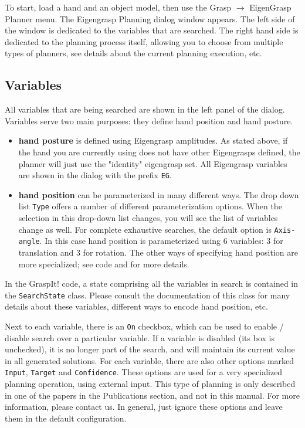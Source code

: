 To start, load a hand and an object model, then use the Grasp $\rightarrow$
EigenGrasp Planner menu. The Eigengrasp Planning dialog window
appears. The left side of the window is dedicated to the variables
that are searched. The right hand side is dedicated to the planning
process itself, allowing you to choose from multiple types of
planners, see details about the current planning execution, etc.

\subsection{Variables}

All variables that are being searched are shown in the left panel of
the dialog. Variables serve two main purposes: they define hand
position and hand posture.
\begin{itemize}
\item \textbf{hand posture} is defined using Eigengrasp amplitudes. As
  stated above, if the hand you are currently using does not have
  other Eigengrasps defined, the planner will just use the "identity"
  eigengrasp set. All Eigengrasp variables are shown in the dialog
  with the prefix \texttt{EG}.
\item \textbf{hand position} can be parameterized in many different
  ways. The drop down list \texttt{Type} offers a number of different
  parameterization options. When the selection in this drop-down list
  changes, you will see the list of variables change as well. For
  complete exhaustive searches, the default option is
  \texttt{Axis-angle}. In this case hand position is parameterized
  using 6 variables: 3 for translation and 3 for rotation. The other
  ways of specifying hand position are more specialized; see code and
   for more details.
\end{itemize}

In the GraspIt! code, a state comprising all the variables in search
is contained in the \texttt{SearchState} class. Please consult the
documentation of this class for many details about these variables,
different ways to encode hand position, etc.

Next to each variable, there is an \texttt{On} checkbox, which can be
used to enable / disable search over a particular variable. If a
variable is disabled (its box is unchecked), it is no longer part of
the search, and will maintain its current value in all generated
solutions. For each variable, there are also other options marked
\texttt{Input}, \texttt{Target} and \texttt{Confidence}. These options
are used for a very specialized planning operation, using external
input. This type of planning is only described in one of the papers in
the Publications section, and not in this manual. For more
information, please contact us. In general, just ignore these options
and leave them in the default configuration.

